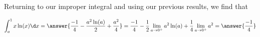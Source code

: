 \documentclass{ximera}
\begin{document}
\begin{exercise}
\begin{exercise}
\begin{exercise}
\begin{exercise}
\begin{exercise}


Returning to our improper integral and using our previous results, we find that 

\[
\int_{a}^{1} x\ln(x) \d x= \answer{\frac{-1}{4} -\frac{a^{2}\ln(a)}{2}+\frac{a^{2}}{4} }=\frac{-1}{4} -\frac{1}{2}\lim_{a \to 0^{+}} a^{2} \ln(a) + \frac{1}{4} \lim_{a \to 0^{+}} a^{2}=\answer{\frac{-1}{4}}
\]



\end{exercise}


\end{exercise}
\end{exercise}

\end{exercise}
\end{exercise}
\end{document}
